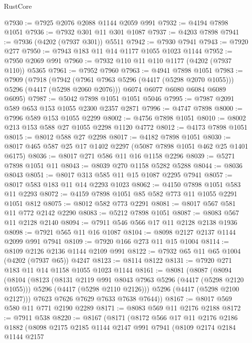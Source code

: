 \begin{lexlean}{RustCore}
\begin{coremodule}
@7930 := @7925 @2076 @2088 @1144 @2059 @991
@7932 := @4194 @7898 @1051
@7936 := @7932 @301 @11 @301 @1087
@7937 := @4203 @7898
@7941 := @7936 (@4202 (@7937 @301)) @5511
@7942 := @7930 @7941
@7943 := @7920 @277
@7950 := @7943 @183 @11 @14 @1177 @1055 @1023 @1144
@7952 := @7950 @2069 @991
@7960 := @7932 @110 @11 @110 @1177 (@4202 (@7937 @110)) @5365
@7961 := @7952 @7960
@7963 := @4941 @7898 @1051
@7983 := @7909
    (@7918
      (@7942 (@7961 @7963 @5296 (@4417 (@5298 @2070 @1055))) @5296 (@4417 (@5298 @2060 @2076)))
      @6074
      @6077
      @6080
      @6084
      @6089
      @6095)
@7987 := @5042 @7898 @1051 @1051 @5046
@7995 := @7987 @2091 @589 @653 @153 @1055 @2300 @2357 @2871
@7996 := @4747 @7898
@8000 := @7996 @589 @153 @1055 @2299
@8002 := @4756 @7898 @1051
@8010 := @8002 @213 @153 @588 @27 @1055 @2298 @1120 @4772
@8012 := @4173 @7898 @1051
@8015 := @8012 @588 @27 @2298
@8017 := @4182 @7898 @1051
@8030 := @8017 @465 @587 @25 @17 @1402 @2297 (@5087 @7898 @1051 @462 @25 @1401 @6175)
@8036 := @8017 @271 @586 @11 @16 @1158 @2296
@8039 := @5271 @7898 @1051 @11
@8043 := @8039 @270 @1158 @5282 @5288
@8044 := @8036 @8043
@8051 := @8017 @313 @585 @11 @15 @1087 @2295 @7941
@8057 := @8017 @583 @183 @11 @14 @2293 @1023
@8062 := @4150 @7898 @1051 @583 @11 @2293
@8072 := @4159 @7898 @1051 @85 @582 @773 @11 @1055 @2291 @1051 @812
@8075 := @8012 @582 @773 @2291
@8081 := @8017 @567 @581 @11 @772 @2142 @2290
@8083 := @5212 @7898 @1051
@8087 := @8083 @567 @11 @2128 @2140
@8094 := @7911 @546 @566 @17 @11 @2128 @2138 @1936
@8098 := @7921 @565 @11 @16 @1087
@8104 := @8098 @2127 @2137 @1144 @2099 @991 @7941
@8109 := @7920 @166 @273 @11 @15 @1004
@8114 := @8109 @2126 @2136 @1144 @2109 @991
@8122 := @7932 @65 @11 @65 @1004 (@4202 (@7937 @65)) @4247
@8123 := @8114 @8122
@8131 := @7920 @271 @183 @11 @14 @1158 @1055 @1023 @1144
@8161 := @8081
    (@8087
      (@8094
        (@8104
          (@8123
            (@8131 @2119 @991 @8043 @7963 @5296 (@4417 (@5298 @2120 @1055)))
            @5296
            (@4417 (@5298 @2110 @2126)))
          @5296
          (@4417 (@5298 @2100 @2127)))
        @7623
        @7626
        @7629
        @7633
        @7638
        @7644))
@8167 := @8017 @569 @580 @11 @771 @2190 @2289
@8171 := @8083 @569 @11 @2176 @2188
@8172 := @7911 @538
@8220 := @8167
    (@8171
      (@8172
        @566
        @17
        @11
        @2176
        @2186
        @1882
        (@8098
          @2175
          @2185
          @1144
          @2147
          @991
          @7941
          (@8109
            @2174
            @2184
            @1144
            @2157

\end{coremodule}
\end{lexlean}
